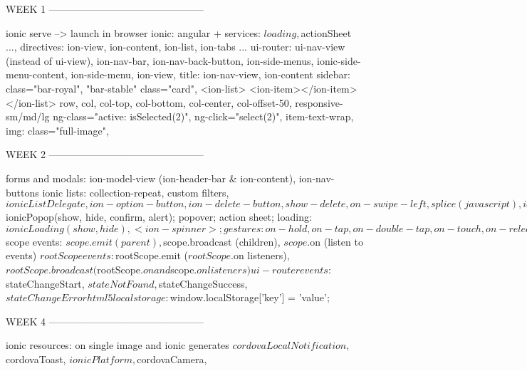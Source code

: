 

WEEK 1 -----------------------------------------------

ionic serve --> launch in browser
ionic: angular + services: $loading, $actionSheet ..., directives: ion-view, ion-content, ion-list, ion-tabs ...
ui-router: ui-nav-view (instead of ui-view), ion-nav-bar, ion-nav-back-button, ion-side-menus, ionic-side-menu-content, ion-side-menu, 
ion-view, title: ion-nav-view, ion-content
sidebar: class="bar-royal", "bar-stable"
class="card", 
<ion-list>
	<ion-item></ion-item>
</ion-list>
row, col, col-top, col-bottom, col-center, col-offset-50, responsive-sm/md/lg
ng-class="{active: isSelected(2)}", ng-click="select(2)", item-text-wrap, img: class="full-image", 


WEEK 2 -----------------------------------------------

forms and modals: ion-model-view (ion-header-bar & ion-content), ion-nav-buttons
ionic lists: collection-repeat, custom filters, $ionicListDelegate, ion-option-button, ion-delete-button, show-delete, on-swipe-left, 
splice (javascript), ion-nav-buttons
popup: $ionicPopop(show, hide, confirm, alert); popover; action sheet; loading: $ionicLoading(show, hide), <ion-spinner>; 
gestures: on-hold, on-tap, on-double-tap, on-touch, on-release, on-drag-up, on-drag-right, on-swipe-left, on-swipe-right, 


WEEK 3 -----------------------------------------------

resolve: ui-router, 
$scope events: $scope.emit (parent), $scope.broadcast (children), $scope.$on (listen to events)
$rootScope events: $rootScope.emit ($rootScope.$on listeners), $rootScope.broadcast ($rootScope.$on and $scope.$on listeners)
ui-router events: $stateChangeStart, $stateNotFound, $stateChangeSuccess, $stateChangeError
html5 local storage: $window.localStorage['key'] = 'value'; 


WEEK 4 -----------------------------------------------

ionic resources: on single image and ionic generates
$cordovaLocalNotification, $cordovaToast, $ionicPlatform, $cordovaCamera, 





